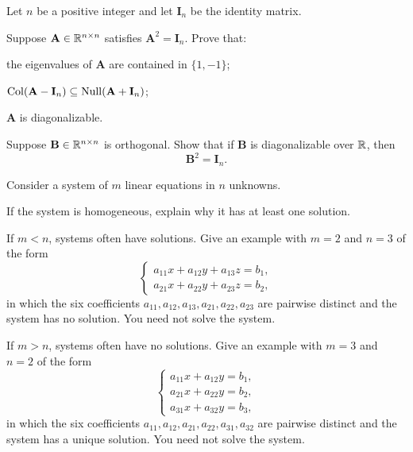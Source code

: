 \documentclass[11pt,oneside]{article}
\begin{document}
\begin{problem}
Let $n$ be a positive integer and let $\mathbf I_n$ be the identity matrix.
\begin{problemsubparts}
\item Suppose $\mathbf A\in\mathbb{R}^{n\times n}$ satisfies $\mathbf A^2=\mathbf I_n$. Prove that:
\begin{problemclauses}
\item the eigenvalues of $\mathbf A$ are contained in $\{1,-1\}$;
\item $\operatorname{Col}(\mathbf A-\mathbf I_n)\subseteq\operatorname{Null}(\mathbf A+\mathbf I_n)$;
\item $\mathbf A$ is diagonalizable.
\end{problemclauses}
\item Suppose $\mathbf B\in\mathbb{R}^{n\times n}$ is orthogonal. Show that if $\mathbf B$ is diagonalizable over $\mathbb{R}$, then
\[
\mathbf B^2=\mathbf I_n.
\]
\end{problemsubparts}
\end{problem}

\begin{problem}
Consider a system of $m$ linear equations in $n$ unknowns.
\begin{problemsubparts}
\item If the system is homogeneous, explain why it has at least one solution.
\item If $m<n$, systems often have solutions. Give an example with $m=2$ and $n=3$ of the form
\[
\begin{cases}
a_{11}x+a_{12}y+a_{13}z=b_1,\\
a_{21}x+a_{22}y+a_{23}z=b_2,
\end{cases}
\]
in which the six coefficients $a_{11},a_{12},a_{13},a_{21},a_{22},a_{23}$ are pairwise distinct and the system has no solution. You need not solve the system.
\item If $m>n$, systems often have no solutions. Give an example with $m=3$ and $n=2$ of the form
\[
\begin{cases}
a_{11}x+a_{12}y=b_1,\\
a_{21}x+a_{22}y=b_2,\\
a_{31}x+a_{32}y=b_3,
\end{cases}
\]
in which the six coefficients $a_{11},a_{12},a_{21},a_{22},a_{31},a_{32}$ are pairwise distinct and the system has a unique solution. You need not solve the system.
\end{problemsubparts}
\end{problem}
\end{document}
